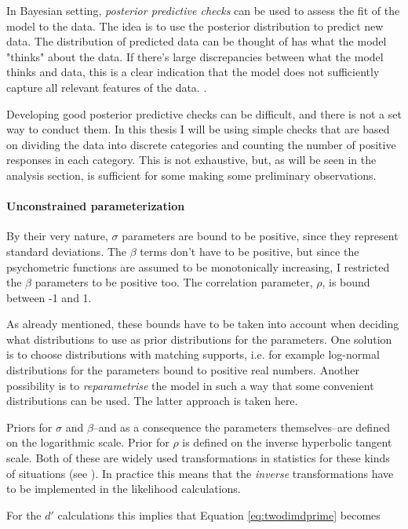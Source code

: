 \documentclass{article}\usepackage{knitr}
\begin{document}
In Bayesian setting, \textit{posterior predictive checks} can be used to assess the fit of the model to the data. The idea is to use the posterior distribution to predict new data. The distribution of predicted data can be thought of has what the model "thinks" about the data. If there's large discrepancies between what the model thinks and data, this is a clear indication that the model does not sufficiently capture all relevant features of the data. \citep[Chapter 7]{bda}.

Developing good posterior predictive checks can be difficult, and there is not a set way to conduct them. In this thesis I will be using simple checks that are based on dividing the data into discrete categories and counting the number of positive responses in each category. This is not exhaustive, but, as will be seen in the analysis section, is sufficient for some making some preliminary observations. 

\paragraph{Unconstrained parameterization}

By their very nature, $\sigma$ parameters are bound to be positive, since they represent standard deviations. The $\beta$ terms don't have to be positive, but since the psychometric functions are assumed to be monotonically increasing, I restricted the $\beta$ parameters to be positive too. The correlation parameter, $\rho$, is bound between -1 and 1. 

As already mentioned, these bounds have to be taken into account when deciding what distributions to use as prior distributions for the parameters. One solution is to choose distributions with matching supports, i.e. for example log-normal distributions for the parameters bound to positive real numbers. Another possibility is to \textit{reparametrise} the model in such a way that some convenient distributions can be used. The latter approach is taken here. 

Priors for $\sigma$ and $\beta$--and as a consequence the parameters themselves--are defined on the logarithmic scale. Prior for $\rho$ is defined on the inverse hyperbolic tangent scale. Both of these are widely used transformations in statistics for these kinds of situations (see \citet[Chapter 22]{stan_manual}). In practice this means  that the \textit{inverse} transformations have to be implemented in the likelihood calculations.

For the $d'$ calculations this implies that Equation \ref{eq:twodimdprime} becomes
\end{document}
